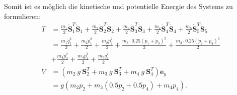 Somit ist es möglich die kinetische und potentielle Energie des Systems zu formulieren:
\begin{align}
	T &= \frac{m_1}{2} \dot{\mathbf{S}}_1^T \dot{\mathbf{S}}_1 + \frac{m_2}{2} \dot{\mathbf{S}}_2^T \dot{\mathbf{S}}_2 + \frac{m_3}{2} \dot{\mathbf{S}}_3^T \dot{\mathbf{S}}_3 + \frac{m_4}{2} \dot{\mathbf{S}}_4^T \dot{\mathbf{S}}_4 + \frac{m_5}{2} \dot{\mathbf{S}}_5^T \dot{\mathbf{S}}_5 \nonumber \\  
	&= \frac{m_{1} \dot{q}_{1}^{2}}{2} + \frac{m_{2} \dot{p}_{1}^{2}}{2} + \frac{m_{2} \dot{p}_{2}^{2}}{2} + \frac{m_{3} \cdot 0.25 \left(\dot{p}_{1} + \dot{p}_{3}\right)^{2}}{2} + \frac{m_{3} \cdot 0.25 \left(\dot{p}_{2} + \dot{p}_{4}\right)^{2}}{2} \nonumber \\
	&+ \frac{m_{4} \dot{p}_{3}^{2}}{2} + \frac{m_{4} \dot{p}_{4}^{2}}{2} + \frac{m_{5} \dot{q}_{2}^{2}}{2} \\
	V &= (m_2 \ g \ \mathbf{S}_2^T + m_3 \ g \ \mathbf{S}_3^T + m_4 \ g \ \mathbf{S}_4^T) \mathbf{e}_y \nonumber \\ &= g \left(m_{2} p_{2} + m_{3} \left(0.5 p_{2} + 0.5 p_{4}\right) + m_{4} p_{4}\right).
\end{align}

